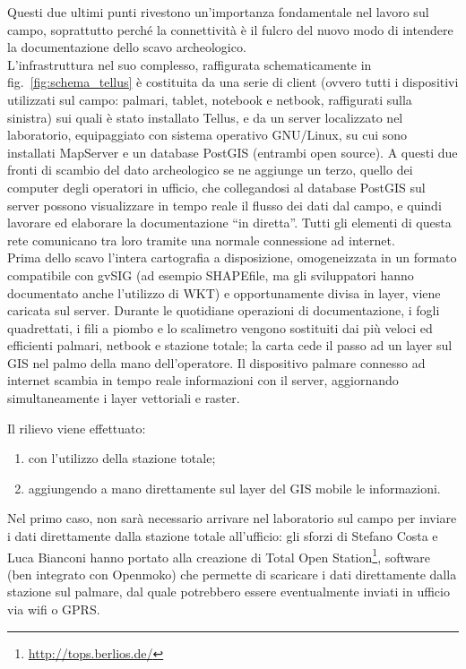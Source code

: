 \documentclass{paper}
\begin{document}
	Questi due ultimi punti rivestono un'importanza fondamentale nel lavoro
	sul campo, soprattutto perch\'{e} la connettività \`{e} il fulcro del nuovo
	modo di intendere la documentazione dello scavo archeologico.\\

	L'infrastruttura nel suo complesso, raffigurata schematicamente in
	fig.~\ref{fig:schema_tellus} \`{e} costituita da una serie di client
	(ovvero tutti i dispositivi utilizzati sul campo: palmari, tablet,
	notebook e netbook, raffigurati sulla sinistra) sui quali \`{e} stato
	installato Tellus, e da un server localizzato nel laboratorio, equipaggiato
	con sistema operativo GNU/Linux, su cui sono installati MapServer
	e un database PostGIS (entrambi open source). A questi due fronti
	di scambio del dato archeologico se ne aggiunge un terzo, quello dei
	computer degli operatori in ufficio, che collegandosi al database
	PostGIS sul server possono visualizzare in tempo reale il flusso dei
	dati dal campo, e quindi lavorare ed elaborare la documentazione ``in
	diretta''. Tutti gli elementi di questa rete comunicano tra loro
	tramite una normale connessione ad internet.\\

	Prima dello scavo l'intera cartografia a disposizione, omogeneizzata
	in un formato compatibile con gvSIG (ad esempio SHAPEfile, ma gli
	sviluppatori hanno documentato anche l'utilizzo di WKT) e opportunamente
	divisa in layer, viene caricata sul server. Durante le quotidiane
	operazioni di documentazione, i fogli quadrettati, i fili a piombo
	e lo scalimetro vengono sostituiti dai più veloci ed efficienti palmari,
	netbook e stazione totale; la carta cede il passo ad un layer sul
	GIS nel palmo della mano dell'operatore. Il dispositivo palmare connesso
	ad internet scambia in tempo reale informazioni con il server, aggiornando
	simultaneamente i layer vettoriali e raster.

	Il rilievo viene effettuato:
	
	\begin{enumerate}
		\item con l'utilizzo della stazione totale;
		\item aggiungendo a mano direttamente sul layer del GIS mobile le informazioni.
	\end{enumerate}

	Nel primo caso, non sar\`{a} necessario arrivare nel laboratorio sul campo
	per inviare i dati direttamente dalla stazione totale all'ufficio:
	gli sforzi di Stefano Costa e Luca Bianconi hanno portato alla creazione
	di Total Open Station\footnote{\href{http://tops.berlios.de/}{http://tops.berlios.de/}},
	software (ben integrato con Openmoko) che permette di scaricare
	i dati direttamente dalla stazione sul palmare, dal quale potrebbero
	essere eventualmente inviati in ufficio via wifi o GPRS.
\end{document}

